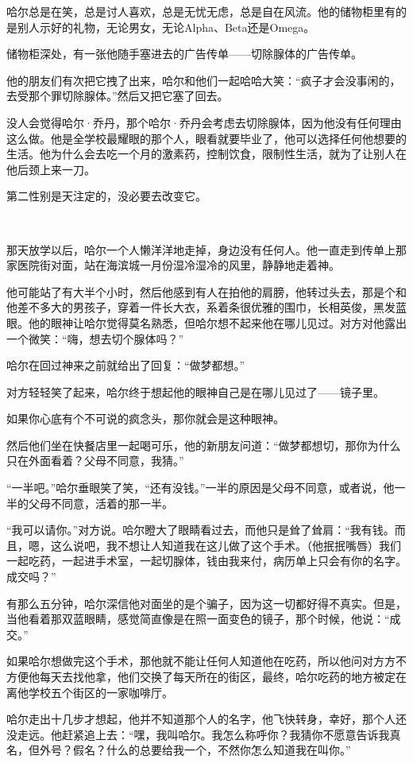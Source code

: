 \documentclass[../main]{subfiles}
\begin{document}
哈尔总是在笑，总是讨人喜欢，总是无忧无虑，总是自在风流。他的储物柜里有的是别人示好的礼物，无论男女，无论Alpha、Beta还是Omega。

储物柜深处，有一张他随手塞进去的广告传单——切除腺体的广告传单。

他的朋友们有次把它拽了出来，哈尔和他们一起哈哈大笑：“疯子才会没事闲的，去受那个罪切除腺体。”然后又把它塞了回去。

没人会觉得哈尔·乔丹，那个哈尔·乔丹会考虑去切除腺体，因为他没有任何理由这么做。他是全学校最耀眼的那个人，眼看就要毕业了，他可以选择任何他想要的生活。他为什么会去吃一个月的激素药，控制饮食，限制性生活，就为了让别人在他后颈上来一刀。

第二性别是天注定的，没必要去改变它。

~\

那天放学以后，哈尔一个人懒洋洋地走掉，身边没有任何人。他一直走到传单上那家医院街对面，站在海滨城一月份湿冷湿冷的风里，静静地走着神。

他可能站了有大半个小时，然后他感到有人在拍他的肩膀，他转过头去，那是个和他差不多大的男孩子，穿着一件长大衣，系着条很优雅的围巾，长相英俊，黑发蓝眼。他的眼神让哈尔觉得莫名熟悉，但哈尔想不起来他在哪儿见过。对方对他露出一个微笑：“嗨，想去切个腺体吗？”

哈尔在回过神来之前就给出了回复：“做梦都想。”

对方轻轻笑了起来，哈尔终于想起他的眼神自己是在哪儿见过了——镜子里。

如果你心底有个不可说的疯念头，那你就会是这种眼神。

然后他们坐在快餐店里一起喝可乐，他的新朋友问道：“做梦都想切，那你为什么只在外面看着？父母不同意，我猜。”

“一半吧。”哈尔垂眼笑了笑，“还有没钱。”一半的原因是父母不同意，或者说，他一半的父母不同意，活着的那一半。

“我可以请你。”对方说。哈尔瞪大了眼睛看过去，而他只是耸了耸肩：“我有钱。而且，嗯，这么说吧，我不想让人知道我在这儿做了这个手术。（他抿抿嘴唇）我们一起吃药，一起进手术室，一起切腺体，钱由我来付，病历单上只会有你的名字。成交吗？”

有那么五分钟，哈尔深信他对面坐的是个骗子，因为这一切都好得不真实。但是，当他看着那双蓝眼睛，感觉简直像是在照一面变色的镜子，那个时候，他说：“成交。”

如果哈尔想做完这个手术，那他就不能让任何人知道他在吃药，所以他问对方方不方便他每天去找他拿，他们交换了每天所在的街区，最终，哈尔吃药的地方被定在离他学校五个街区的一家咖啡厅。

哈尔走出十几步才想起，他并不知道那个人的名字，他飞快转身，幸好，那个人还没走远。他赶紧追上去：“嘿，我叫哈尔。我怎么称呼你？我猜你不愿意告诉我真名，但外号？假名？什么的总要给我一个，不然你怎么知道我在叫你。”
\end{document}
